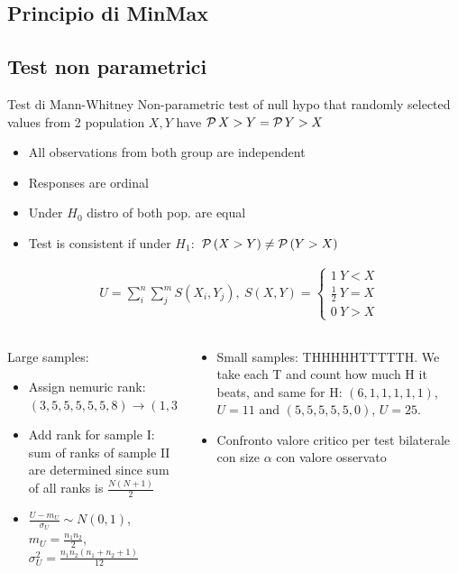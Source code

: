 \documentclass[asd-beamer.tex]{subfiles}%
\begin{document}
\subsection{Principio di MinMax}

\begin{frame}{}

\end{frame}
\subsection{Test non parametrici}

\begin{frame}{Test di Mann-Whitney}
    Non-parametric test of null hypo that randomly selected values from 2 population $X,Y$ have $\operatorname{\mathcal{P}}{X>Y}=\operatorname{\mathcal{P}}{Y>X}$
    \begin{itemize}
    \item All observations from both group are independent
    \item Responses are ordinal
    \item Under $H_0$ distro of both pop. are equal
    \item Test is consistent if under $H_1:$ $\operatorname{\mathcal{P}}{(X>Y)}\neq\operatorname{\mathcal{P}}{(Y>X)}$
    \end{itemize}
    \begin{align*}
        &U=\sum_i^n\sum_j^mS(X_i,Y_j),\ S(X,Y)=\left\{\begin{array}{l}
            1\ Y<X\\\frac{1}{2}\ Y=X\\0\ Y>X
        \end{array}\right.
     \end{align*}
    \begin{columns}[T]
        \begin{column}{0.5\textwidth}
            Large samples:
            \begin{itemize}
                \item Assign nemuric rank: $(3,5,5,5,5,5,8)\to(1,3.5,3.5,3.5,3.5,3.5,6)$
                \item Add rank for sample I: sum of ranks of sample II are determined since sum of all ranks is $\frac{N(N+1)}{2}$
                \item $\frac{U-m_U}{\sigma_U}\sim N(0,1)$, $m_U=\frac{n_1n_2}{2}$, $\sigma_U^2=\frac{n_1n_2(n_1+n_2+1)}{12}$
            \end{itemize}
        \end{column}
        \begin{column}{0.5\textwidth}
            \begin{itemize}
                \item Small samples: THHHHHTTTTTH. We take each T and count how much H it beats, and same for H: $(6,1,1,1,1,1)$, $U=11$ and $(5,5,5,5,5,0)$, $U=25$.
                \item Confronto valore critico per test bilaterale con size $\alpha$ con valore osservato
            \end{itemize}
        \end{column}
    \end{columns}
\end{frame}
 
\end{document}
